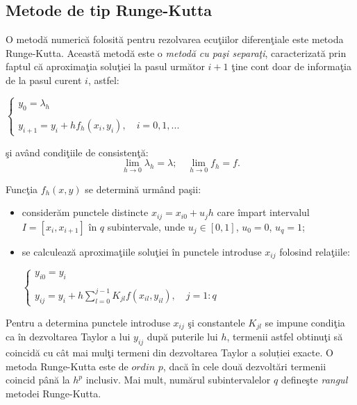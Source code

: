 \documentclass{exam}
\begin{document}
\subsection{Metode de tip Runge-Kutta}

O metodă numerică folosită pentru rezolvarea ecuţiilor diferenţiale este metoda Runge-Kutta. Această metodă este o \textit{metodă cu paşi separaţi}, caracterizată prin faptul că aproximaţia soluţiei la pasul următor ${i+1}$ ţine cont doar de informaţia de la pasul curent $i$, astfel:
\begin{center}
	$\left\{
		\begin{array}{ll}
			y_{0} = \lambda_{h} \\ \\
			y_{i+1} = y_i + hf_h(x_{i},y_{i}), \quad  i = 0,1,...
		\end{array}
		\right.$
\end{center}

\noindent şi având condiţiile de consistenţă:
$$\lim_{h \to 0} \lambda_{h} = \lambda; \quad \lim_{h \to 0} f_{h} = f .
$$

Funcţia $f_{h}(x,y)$ se determină urmând paşii:
\begin{itemize}
	\item considerăm punctele distincte $x_{ij} = x_{i0}+u_jh$ care împart intervalul $I=[x_{i},x_{i+1}]$ în $q$ subintervale, unde $u_{j} \in [0,1]$, $u_0=0$, $u_q=1$;
	\item se calculează aproximaţiile soluţiei în punctele introduse $x_{ij}$ folosind relaţiile:
	      \begin{center}
		      $\left\{
			      \begin{array}{ll}
				      y_{i0} = y_i \\ \\
				      y_{ij} = y_i + h\sum_{l=0}^{j-1}K_{jl}f(x_{il},y_{il}), \quad  j = 1:q
			      \end{array}
			      \right.$
	      \end{center}
\end{itemize}

Pentru a determina punctele introduse $x_{ij}$ şi constantele $K_{jl}$ se impune condiţia ca în dezvoltarea Taylor a lui $y_{ij}$ după puterile lui $h$, termenii astfel obtinuţi să coincidă cu cât mai mulţi termeni din dezvoltarea Taylor a soluției exacte. O metoda Runge-Kutta este de $ordin$ $p$, dacă în cele două dezvoltări termenii coincid până la $h^p$ inclusiv. Mai mult, numărul subintervalelor $q$ defineşte \textit{rangul} metodei Runge-Kutta.
\end{document}
